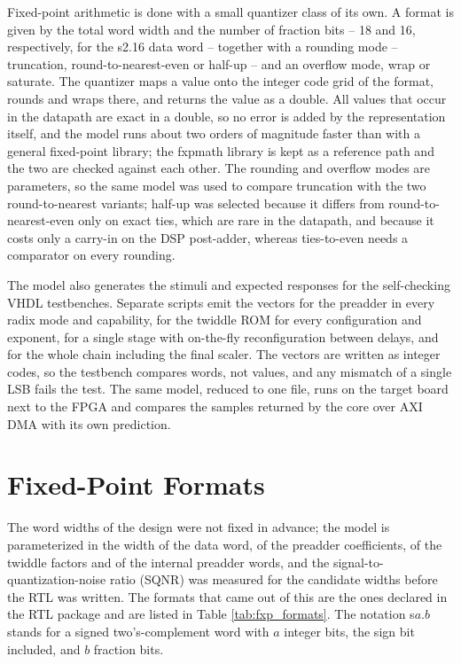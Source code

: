 \documentclass[a4paper,12pt, master]{etf}
\begin{document}
Fixed-point arithmetic is done with a small quantizer class of its own. A format is given by the total word width and the number of fraction bits -- 18 and 16, respectively, for the s2.16 data word -- together with a rounding mode -- truncation, round-to-nearest-even or half-up -- and an overflow mode, wrap or saturate. The quantizer maps a value onto the integer code grid of the format, rounds and wraps there, and returns the value as a double. All values that occur in the datapath are exact in a double, so no error is added by the representation itself, and the model runs about two orders of magnitude faster than with a general fixed-point library; the fxpmath library \cite{fxpmath} is kept as a reference path and the two are checked against each other. The rounding and overflow modes are parameters, so the same model was used to compare truncation with the two round-to-nearest variants; half-up was selected because it differs from round-to-nearest-even only on exact ties, which are rare in the datapath, and because it costs only a carry-in on the DSP post-adder, whereas ties-to-even needs a comparator on every rounding.

The model also generates the stimuli and expected responses for the self-checking VHDL testbenches. Separate scripts emit the vectors for the preadder in every radix mode and capability, for the twiddle ROM for every configuration and exponent, for a single stage with on-the-fly reconfiguration between delays, and for the whole chain including the final scaler. The vectors are written as integer codes, so the testbench compares words, not values, and any mismatch of a single LSB fails the test. The same model, reduced to one file, runs on the target board next to the FPGA and compares the samples returned by the core over AXI DMA with its own prediction.

\section{Fixed-Point Formats}

The word widths of the design were not fixed in advance; the model is parameterized in the width of the data word, of the preadder coefficients, of the twiddle factors and of the internal preadder words, and the signal-to-quantization-noise ratio (SQNR) was measured for the candidate widths before the RTL was written. The formats that came out of this are the ones declared in the RTL package and are listed in Table \ref{tab:fxp_formats}. The notation s$a$.$b$ stands for a signed two's-complement word with $a$ integer bits, the sign bit included, and $b$ fraction bits.
\end{document}
